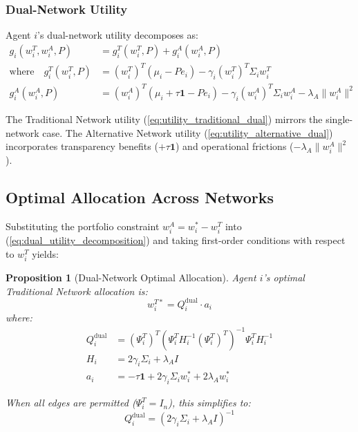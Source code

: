 \documentclass[12pt]{article}
\newtheorem{proposition}[theorem]{Proposition}
\begin{document}
\subsubsection{Dual-Network Utility}

Agent $i$'s dual-network utility decomposes as:
\begin{align}
g_i(w_i^T, w_i^A, P) &= g_i^T(w_i^T, P) + g_i^A(w_i^A, P) \label{eq:dual_utility_decomposition} \\
\text{where} \quad g_i^T(w_i^T, P) &= (w_i^T)^T(\mu_i - Pe_i) - \gamma_i (w_i^T)^T\Sigma_i w_i^T \label{eq:utility_traditional_dual} \\
g_i^A(w_i^A, P) &= (w_i^A)^T(\mu_i + \tau \mathbf{1} - Pe_i) - \gamma_i (w_i^A)^T\Sigma_i w_i^A - \lambda_A\|w_i^A\|^2 \label{eq:utility_alternative_dual}
\end{align}

The Traditional Network utility (\ref{eq:utility_traditional_dual}) mirrors the single-network case. The Alternative Network utility (\ref{eq:utility_alternative_dual}) incorporates transparency benefits ($+\tau \mathbf{1}$) and operational frictions ($-\lambda_A\|w_i^A\|^2$).

\subsection{Optimal Allocation Across Networks}

Substituting the portfolio constraint $w_i^A = w_i^* - w_i^T$ into (\ref{eq:dual_utility_decomposition}) and taking first-order conditions with respect to $w_i^T$ yields:

\begin{proposition}[Dual-Network Optimal Allocation]
\label{prop:dual_optimal}
Agent $i$'s optimal Traditional Network allocation is:
\begin{equation}
w_i^{T*} = Q_i^{\text{dual}} \cdot a_i
\label{eq:dual_optimal_allocation_main}
\end{equation}
where:
\begin{align}
Q_i^{\text{dual}} &= (\Psi_i^T)^T(\Psi_i^T H_i^{-1} (\Psi_i^T)^T)^{-1}\Psi_i^T H_i^{-1} \label{eq:Q_dual_matrix} \\
H_i &= 2\gamma_i\Sigma_i + \lambda_A I \label{eq:H_matrix} \\
a_i &= -\tau \mathbf{1} + 2\gamma_i\Sigma_i w_i^* + 2\lambda_A w_i^* \label{eq:offset_vector}
\end{align}

When all edges are permitted ($\Psi_i^T = I_n$), this simplifies to:
\begin{equation}
Q_i^{\text{dual}} = (2\gamma_i\Sigma_i + \lambda_A I)^{-1}
\label{eq:Q_dual_simplified}
\end{equation}
\end{proposition}
\end{document}
